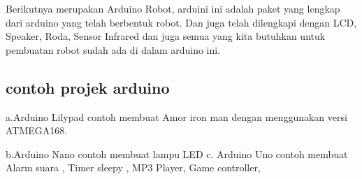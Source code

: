 	Berikutnya merupakan Arduino Robot, arduini ini adalah paket yang lengkap dari arduino yang telah berbentuk robot. Dan juga telah dilengkapi dengan LCD, Speaker, Roda, Sensor Infrared dan juga semua yang kita butuhkan untuk pembuatan robot sudah ada di dalam arduino ini.

\subsection{contoh projek arduino}
	a.Arduino Lilypad contoh membuat Amor iron man dengan menggunakan versi ATMEGA168.

	b.Arduino Nano contoh membuat lampu LED
	c. Arduino Uno contoh membuat Alarm suara , Timer sleepy , MP3 Player, Game controller,
